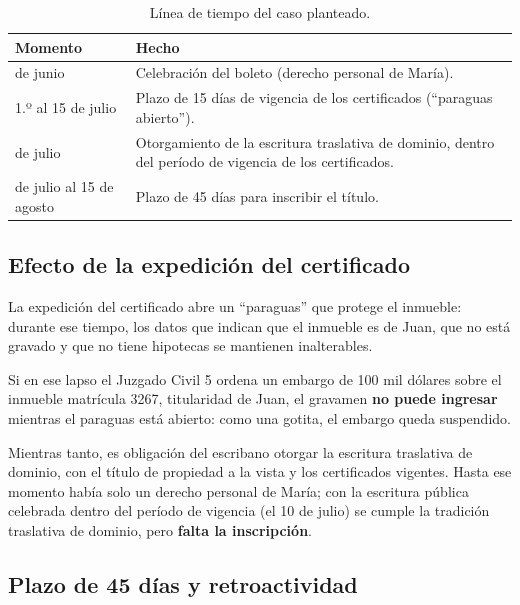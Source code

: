 \documentclass[12pt,oneside]{book}
\begin{document}
\begin{table}[H]
\centering
\begin{tabularx}{\textwidth}{>{\raggedright\arraybackslash}p{}>{\raggedright\arraybackslash}X}
\toprule
\textbf{Momento} & \textbf{Hecho} \\
\midrule
10 de junio & Celebración del boleto (derecho personal de María). \\
1.º al 15 de julio & Plazo de 15 días de vigencia de los certificados (``paraguas abierto''). \\
10 de julio & Otorgamiento de la escritura traslativa de dominio, dentro del período de vigencia de los certificados. \\
10 de julio al 15 de agosto & Plazo de 45 días para inscribir el título. \\
\bottomrule
\end{tabularx}
\caption{Línea de tiempo del caso planteado.}
\end{table}

\subsection{Efecto de la expedición del certificado}

La expedición del certificado abre un ``paraguas'' que protege el inmueble: durante ese tiempo, los datos que indican que el inmueble es de Juan, que no está gravado y que no tiene hipotecas se mantienen inalterables.

Si en ese lapso el Juzgado Civil 5 ordena un embargo de 100 mil dólares sobre el inmueble matrícula 3267, titularidad de Juan, el gravamen \textbf{no puede ingresar} mientras el paraguas está abierto: como una gotita, el embargo queda suspendido.

Mientras tanto, es obligación del escribano otorgar la escritura traslativa de dominio, con el título de propiedad a la vista y los certificados vigentes. Hasta ese momento había solo un derecho personal de María; con la escritura pública celebrada dentro del período de vigencia (el 10 de julio) se cumple la tradición traslativa de dominio, pero \textbf{falta la inscripción}.

\subsection{Plazo de 45 días y retroactividad}
\end{document}
